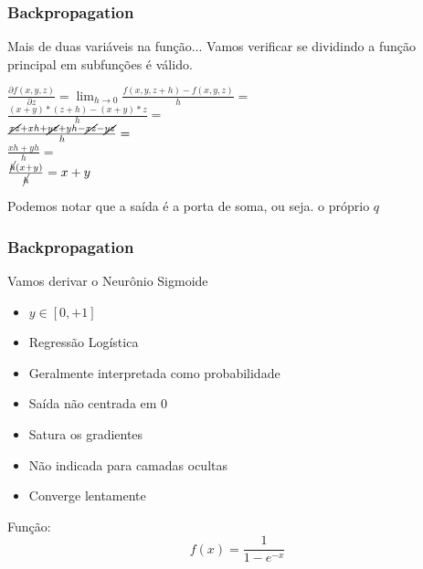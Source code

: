 \documentclass{beamer}
\begin{document}
\begin{frame}
	\frametitle{Backpropagation}
	\begin{block}{Mais de duas variáveis na função...}
		Vamos verificar se dividindo a função principal em subfunções é válido.
	\end{block}
	\begin{example}
		\renewcommand{\CancelColor}{\color{red}}
		$\frac{\partial f(x,y, z)}{\partial z} = \lim_{h \rightarrow 0 }\frac{f(x, y,z+h) - f(x,y,z)}{h} = $ \\ 
		
		$ \frac{(x + y)*(z + h) - (x + y)*z}{h} = $ \\ $\frac{\cancel{xz}+xh + \cancel{yz} + yh - \cancel{xz} - \cancel{yz}}{h} = $ \\ $\frac{xh + yh}{h} =  $\\ $\frac{\cancel{h}(x + y)}{\cancel{h}} = x + y $
		
		Podemos notar que a saída é a porta de soma, ou seja. o próprio $q$
	\end{example}
\end{frame}
\begin{frame}
	\frametitle{Backpropagation}
	\begin{block}{Vamos derivar o Neurônio Sigmoide}
		\begin{itemize}
			\item $y \in [0, + 1]$
			\item Regressão Logística
			\item Geralmente interpretada como probabilidade
			\item Saída não centrada em $0$
			\item Satura os gradientes
			\item Não indicada para camadas ocultas
			\item Converge lentamente
		\end{itemize}
		Função:
		$$f(x) = \frac{1}{1-e^{-x}}$$
	\end{block}
\end{frame}
\end{document}
